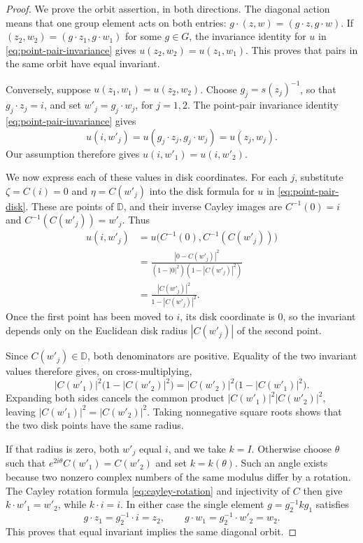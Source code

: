\begin{proof}
We prove the orbit assertion, in both directions. The diagonal action means that one group element acts on both entries: $g\cdot(z,w)=(g\cdot z,g\cdot w)$. If $(z_2,w_2)=(g\cdot z_1,g\cdot w_1)$ for some $g\in G$, the invariance identity for $u$ in \eqref{eq:point-pair-invariance} gives $u(z_2,w_2)=u(z_1,w_1)$. This proves that pairs in the same orbit have equal invariant.

Conversely, suppose $u(z_1,w_1)=u(z_2,w_2)$. Choose $g_j=s(z_j)^{-1}$, so that $g_j\cdot z_j=i$, and set $w'_j=g_j\cdot w_j$, for $j=1,2$. The point-pair invariance identity \eqref{eq:point-pair-invariance} gives
\[
 u(i,w'_j)=u(g_j\cdot z_j,g_j\cdot w_j)=u(z_j,w_j).
\]
Our assumption therefore gives $u(i,w'_1)=u(i,w'_2)$.

We now express each of these values in disk coordinates. For each $j$, substitute $\zeta=C(i)=0$ and $\eta=C(w'_j)$ into the disk formula for $u$ in \eqref{eq:point-pair-disk}. These are points of $\mathbb D$, and their inverse Cayley images are $C^{-1}(0)=i$ and $C^{-1}(C(w'_j))=w'_j$. Thus
\[
 \begin{aligned}
 u(i,w'_j)
 &=u\bigl(C^{-1}(0),C^{-1}(C(w'_j))\bigr)\\
 &=\frac{|0-C(w'_j)|^2}{(1-|0|^2)(1-|C(w'_j)|^2)}\\
 &=\frac{|C(w'_j)|^2}{1-|C(w'_j)|^2}.
 \end{aligned}
\]
Once the first point has been moved to $i$, its disk coordinate is $0$, so the invariant depends only on the Euclidean disk radius $|C(w'_j)|$ of the second point.

Since $C(w'_j)\in\mathbb D$, both denominators are positive. Equality of the two invariant values therefore gives, on cross-multiplying,
\[
 |C(w'_1)|^2\bigl(1-|C(w'_2)|^2\bigr)
 =|C(w'_2)|^2\bigl(1-|C(w'_1)|^2\bigr).
\]
Expanding both sides cancels the common product $|C(w'_1)|^2|C(w'_2)|^2$, leaving $|C(w'_1)|^2=|C(w'_2)|^2$. Taking nonnegative square roots shows that the two disk points have the same radius.

If that radius is zero, both $w'_j$ equal $i$, and we take $k=I$. Otherwise choose $\theta$ such that $e^{2i\theta}C(w'_1)=C(w'_2)$ and set $k=k(\theta)$. Such an angle exists because two nonzero complex numbers of the same modulus differ by a rotation. The Cayley rotation formula \eqref{eq:cayley-rotation} and injectivity of $C$ then give $k\cdot w'_1=w'_2$, while $k\cdot i=i$. In either case the single element $g=g_2^{-1}kg_1$ satisfies
\[
 g\cdot z_1=g_2^{-1}\cdot i=z_2,\qquad
 g\cdot w_1=g_2^{-1}\cdot w'_2=w_2.
\]
This proves that equal invariant implies the same diagonal orbit.
\end{proof}


